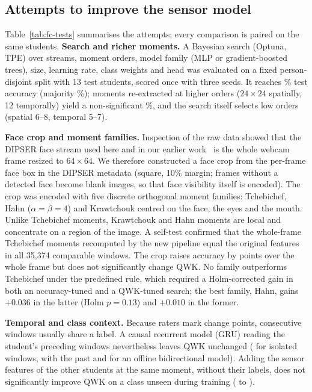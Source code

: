 \subsection{Attempts to improve the sensor model}
\label{sec:fc-limits}
Table~\ref{tab:fc-tests} summarises the attempts; every comparison is paired on the same students. \textbf{Search and richer moments.} A Bayesian search (Optuna, TPE) over streams, moment orders, model family (MLP or gradient-boosted trees), size, learning rate, class weights and head was evaluated on a fixed person-disjoint split with 13 test students, scored once with three seeds. It reaches \fcSearchPaperAcc\% test accuracy (majority \fcSearchMajority\%); moments re-extracted at higher orders ($24\times24$ spatially, 12 temporally) yield a non-significant \fcSearchRichAcc\%, and the search itself selects low orders (spatial 6--8, temporal 5--7).

\textbf{Face crop and moment families.}
\label{sec:fc-crop}
Inspection of the raw data showed that the DIPSER face stream used here and in our earlier work~\cite{makhkhas2026ordinal} is the whole webcam frame resized to $64\times64$. We therefore constructed a face crop from the per-frame face box in the DIPSER metadata (square, 10\% margin; frames without a detected face become blank images, so that face visibility itself is encoded). The crop was encoded with five discrete orthogonal moment families: Tchebichef, Hahn ($\alpha=\beta=4$) and Krawtchouk centred on the face, the eyes and the mouth. Unlike Tchebichef moments, Krawtchouk and Hahn moments are local and concentrate on a region of the image. A self-test confirmed that the whole-frame Tchebichef moments recomputed by the new pipeline equal the original features in all 35{,}374 comparable windows. The crop raises accuracy by \fcCropAccGain{} points \fcCropAccCI{} over the whole frame but does not significantly change QWK. No family outperforms Tchebichef under the predefined rule, which required a Holm-corrected gain in both an accuracy-tuned and a QWK-tuned search; the best family, Hahn, gains $+0.036$ in the latter (Holm $p=0.13$) and $+0.010$ in the former.

\textbf{Temporal and class context.} Because raters mark change points, consecutive windows usually share a label. A causal recurrent model (GRU) reading the student's preceding windows nevertheless leaves QWK unchanged (\fcCtxNoneQWK{} for isolated windows, \fcCtxGruQWK{} with the past and \fcCtxBiQWK{} for an offline bidirectional model). Adding the sensor features of the other students at the same moment, without their labels, does not significantly improve QWK on a class unseen during training (\fcLogoOwnQWK{} to \fcLogoClassQWK).

